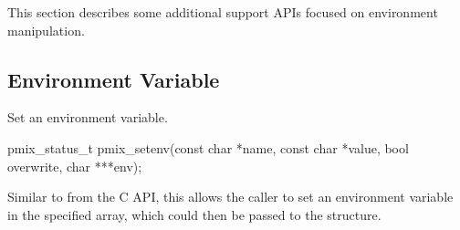 This section describes some additional support APIs focused on environment manipulation.

\subsection{Environment Variable}

\summary

Set an environment variable.

\cspecificstart
\begin{codepar}
pmix_status_t
pmix_setenv(const char *name, const char *value,
            bool overwrite, char ***env);
\end{codepar}
\cspecificend


\begin{arglist}
\end{arglist}

\descr

Similar to  from the C API, this allows the caller to set an environment variable in the specified  array, which could then be passed to the  structure.

